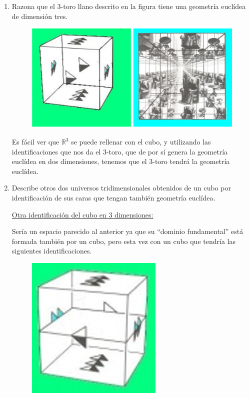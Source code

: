 \begin{enumerate}
\item  Razona que el 3-toro llano descrito en la figura tiene una geometría euclídea de dimensión tres.

\begin{figure}[H]
	\centering
	\includegraphics[scale=0.5]{images/geometria_universo/pagina_9_1.png}
\end{figure}

Es fácil ver que $\mathds{R}^3$ se puede rellenar con el cubo, y utilizando las identificaciones que nos da el 3-toro, que de por sí genera la geometría euclídea en dos dimensiones, tenemos que el 3-toro tendrá la geometría euclídea.

\item Describe otros dos universos tridimensionales obtenidos de un cubo por identificación de sus caras que tengan también geometría euclídea.

\underline{Otra identificación del cubo en 3 dimensiones:}

Sería un espacio parecido al anterior ya que su ``dominio fundamental'' está formada también por un cubo, pero esta vez con un cubo que tendría las siguientes identificaciones.

\begin{figure}[H]
\centering
\includegraphics[scale=0.5]{images/geometria_universo/pagina_9_2.png}
\end{figure}


\end{enumerate}
